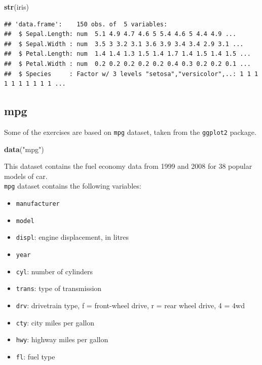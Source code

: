 \documentclass[]{book}
\newenvironment{Shaded}{\begin{snugshade}}{\end{snugshade}}
\newcommand{\KeywordTok}[1]{\textcolor[rgb]{0.13,0.29,0.53}{\textbf{{#1}}}}
\newcommand{\StringTok}[1]{\textcolor[rgb]{0.31,0.60,0.02}{{#1}}}
\newcommand{\NormalTok}[1]{{#1}}
\providecommand{\tightlist}{%
  \setlength{\itemsep}{0pt}\setlength{\parskip}{0pt}}
\def\tightlist{}
\begin{document}
\begin{Shaded}
\begin{Highlighting}[]
\KeywordTok{str}\NormalTok{(iris)}
\end{Highlighting}
\end{Shaded}

\begin{verbatim}
## 'data.frame':    150 obs. of  5 variables:
##  $ Sepal.Length: num  5.1 4.9 4.7 4.6 5 5.4 4.6 5 4.4 4.9 ...
##  $ Sepal.Width : num  3.5 3 3.2 3.1 3.6 3.9 3.4 3.4 2.9 3.1 ...
##  $ Petal.Length: num  1.4 1.4 1.3 1.5 1.4 1.7 1.4 1.5 1.4 1.5 ...
##  $ Petal.Width : num  0.2 0.2 0.2 0.2 0.2 0.4 0.3 0.2 0.2 0.1 ...
##  $ Species     : Factor w/ 3 levels "setosa","versicolor",..: 1 1 1 1 1 1 1 1 1 1 ...
\end{verbatim}

\subsection{mpg}\label{mpg}

Some of the exercises are based on \texttt{mpg} dataset, taken from the
\texttt{ggplot2} package.

\begin{Shaded}
\begin{Highlighting}[]
\KeywordTok{data}\NormalTok{(}\StringTok{"mpg"}\NormalTok{)}
\end{Highlighting}
\end{Shaded}

This dataset contains the fuel economy data from 1999 and 2008 for 38
popular models of car.\\
\texttt{mpg} dataset contains the following variables:

\begin{itemize}
\tightlist
\item
  \texttt{manufacturer}
\item
  \texttt{model}
\item
  \texttt{displ}: engine displacement, in litres
\item
  \texttt{year}
\item
  \texttt{cyl}: number of cylinders
\item
  \texttt{trans}: type of transmission
\item
  \texttt{drv}: drivetrain type, f = front-wheel drive, r = rear wheel
  drive, 4 = 4wd
\item
  \texttt{cty}: city miles per gallon
\item
  \texttt{hwy}: highway miles per gallon
\item
  \texttt{fl}: fuel type
\end{itemize}
\end{document}
